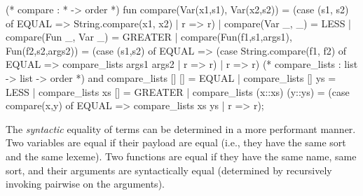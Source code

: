 \nwenddocs{}\endmoddef\nwstartdeflinemarkup{}\nwenddeflinemarkup
(* compare :  *  -> order *)
fun compare(Var(x1,s1), Var(x2,s2)) =
    (case (s1, s2) of
      EQUAL => String.compare(x1, x2)
    | r => r)
  | compare(Var _, _) = LESS
  | compare(Fun _, Var _) = GREATER
  | compare(Fun(f1,s1,args1), Fun(f2,s2,args2)) =
    (case (s1,s2) of
      EQUAL => (case String.compare(f1, f2) of
                 EQUAL => compare_lists args1 args2
               | r => r)
    | r => r)
(* compare_lists :  list ->  list -> order *)
and compare_lists [] [] = EQUAL
  | compare_lists [] ys = LESS
  | compare_lists xs [] = GREATER
  | compare_lists (x::xs) (y::ys) =
     (case compare(x,y) of
       EQUAL => compare_lists xs ys
     | r => r);
\eatline
{}\nwendcode{}\nwdocspar
\begin{node}
The \emph{syntactic} equality of terms can be determined in a more
performant manner. Two variables are equal if their payload are equal
(i.e., they have the same sort and the same lexeme). Two functions are
equal if they have the same name, same sort, and their arguments are
syntactically equal (determined by recursively invoking {\Tt{}\nwendquote}
pairwise on the arguments).
\end{node}

